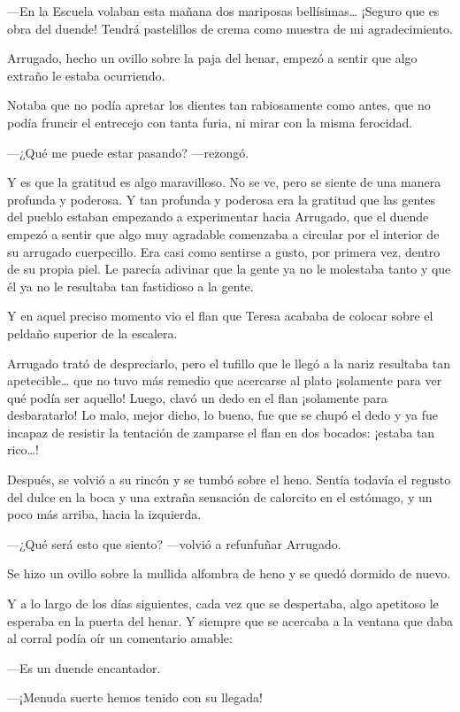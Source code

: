 \documentclass{barcodevapor3pags}
\begin{document}
---En la Escuela volaban esta mañana dos mariposas bellísimas\ldots{}
¡Seguro que es obra del duende! Tendrá pastelillos de crema como muestra
de mi agradecimiento.

Arrugado, hecho un ovillo sobre la paja del henar, empezó a sentir que
algo extraño le estaba ocurriendo.

Notaba que no podía apretar los dientes tan rabiosamente como antes, que
no podía fruncir el entrecejo con tanta furia, ni mirar con la misma
ferocidad.

---¿Qué me puede estar pasando? ---rezongó.

Y es que la gratitud es algo maravilloso. No se ve, pero se siente de
una manera profunda y poderosa. Y tan profunda y poderosa era la
gratitud que las gentes del pueblo estaban empezando a experimentar
hacia Arrugado, que el duende empezó a sentir que algo muy agradable
comenzaba a circular por el interior de su arrugado cuerpecillo. Era
casi como sentirse a gusto, por primera vez, dentro de su propia piel.
Le parecía adivinar que la gente ya no le molestaba tanto y que él ya no
le resultaba tan fastidioso a la gente.

Y en aquel preciso momento vio el flan que Teresa acababa de colocar
sobre el peldaño superior de la escalera.

Arrugado trató de despreciarlo, pero el tufillo que le llegó a la nariz
resultaba tan apetecible\ldots{} que no tuvo más remedio que acercarse
al plato ¡solamente para ver qué podía ser aquello! Luego, clavó un dedo
en el flan ¡solamente para desbaratarlo! Lo malo, mejor dicho, lo bueno,
fue que se chupó el dedo y ya fue incapaz de resistir la tentación de
zamparse el flan en dos bocados: ¡estaba tan rico\ldots!

Después, se volvió a su rincón y se tumbó sobre el heno. Sentía todavía
el regusto del dulce en la boca y una extraña sensación de calorcito en
el estómago, y un poco más arriba, hacia la izquierda.

---¿Qué será esto que siento? ---volvió a refunfuñar Arrugado.

Se hizo un ovillo sobre la mullida alfombra de heno y se quedó dormido
de nuevo.

Y a lo largo de los días siguientes, cada vez que se despertaba, algo
apetitoso le esperaba en la puerta del henar. Y siempre que se acercaba
a la ventana que daba al corral podía oír un comentario amable:

---Es un duende encantador.

---¡Menuda suerte hemos tenido con su llegada!
\end{document}
